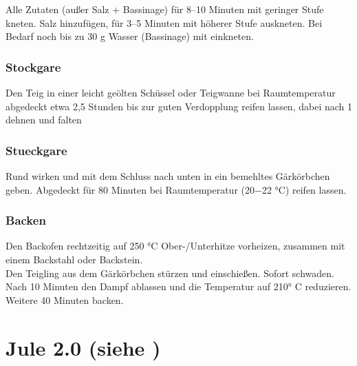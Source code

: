 Alle Zutaten (außer Salz + Bassinage) für 8–10 Minuten mit geringer Stufe kneten. Salz hinzufügen, für 3–5 Minuten mit höherer Stufe auskneten. Bei Bedarf noch bis zu 30 g Wasser (Bassinage) mit einkneten.


\subsubsection*{\Gls{Stockgare}}
Den Teig in einer leicht geölten Schüssel oder Teigwanne bei Raumtemperatur abgedeckt etwa 2,5 Stunden bis zur guten Verdopplung reifen lassen, dabei nach 1 dehnen und falten


\subsubsection*{\Gls{Stueckgare}}
Rund wirken und mit dem Schluss nach unten in ein bemehltes Gärkörbchen geben. Abgedeckt für 80 Minuten bei Raumtemperatur (20−22 °C) reifen lassen. 

\subsubsection*{\Gls{Backen}}
Den Backofen rechtzeitig auf 250 °C Ober-/Unterhitze  vorheizen, zusammen mit einem Backstahl oder Backstein.\\
Den Teigling aus dem Gärkörbchen stürzen und einschießen. Sofort schwaden. \\
Nach 10 Minuten den Dampf ablassen und die Temperatur auf 210° C reduzieren. Weitere 40 Minuten backen.

\section[Jule 2.0]{Jule 2.0 \textmd{(siehe \cite{sonjaJule2})}}  


